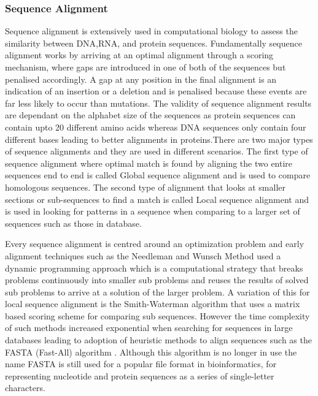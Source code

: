 \subsubsection{Sequence Alignment}
Sequence alignment is extensively used in computational biology to assess the similarity between DNA,RNA, and protein sequences. Fundamentally sequence alignment works by arriving at an optimal alignment through a scoring mechanism, where gaps are introduced in one of both of the sequences but penalised accordingly. A gap at any position in the final alignment is an indication of an insertion or a deletion and is penalised because these events are far less likely to occur than mutations. The validity of sequence alignment results are dependant on the alphabet size of the sequences  as protein sequences can contain upto 20 different amino acids whereas DNA sequences only contain four different bases leading to better alignments in proteins.There are two major types of sequence alignments and they are used in different scenarios. The first type of sequence alignment where optimal match is found by aligning the two entire sequences end to end is called Global sequence alignment and is used to compare homologous sequences. The second type of alignment that looks at smaller sections or sub-sequences to find a match is called Local sequence alignment and is used in looking for patterns in a sequence when comparing to a larger set of sequences such as those in database. 

Every sequence alignment is centred around an optimization problem and early alignment techniques such as the Needleman and Wunsch Method \cite{needleman1970general} used a dynamic programming approach which is a computational strategy that breaks problems continuously into smaller sub problems and reuses the results of solved sub problems to arrive at a solution of the larger problem. A variation of this for local sequence alignment is the Smith-Waterman algorithm\cite{smith1981identification} that uses a matrix based  scoring scheme for comparing sub sequences.
However the time complexity of such methods increased exponential when searching for sequences in large databases leading to adoption of heuristic methods to align sequences such as the FASTA (Fast-All) algorithm \cite{lipman1985rapid}. Although this algorithm is no longer in use the name FASTA is still used for a popular file format in bioinformatics, for representing nucleotide and protein sequences as a series of single-letter characters.

